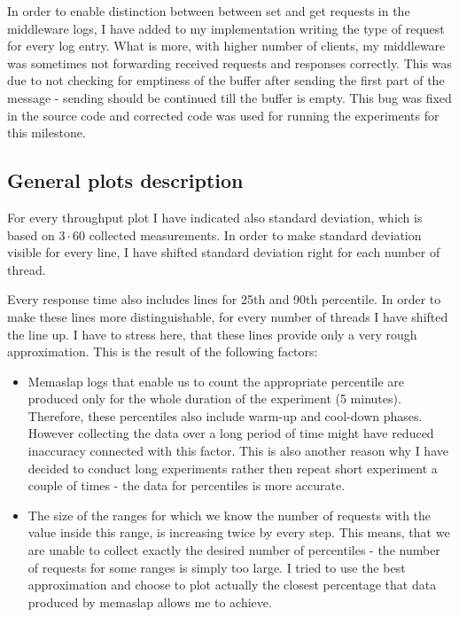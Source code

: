 \documentclass[11pt]{article}
\begin{document}
In order to enable distinction between between set and get requests in the middleware logs, I have added to my implementation writing the type of request for every log entry. What is more, with higher number of clients, my middleware was sometimes not forwarding received requests and responses correctly. This was due to not checking for emptiness of the buffer after sending the first part of the message - sending should be continued till the buffer is empty. This bug was fixed in the source code and corrected code was used for running the experiments for this milestone.

\subsection{General plots description}
\label{sec:max-throughput-plots}

For every throughput plot I have indicated also standard deviation, which is based on $3\cdot60$ collected measurements. In order to make standard deviation visible for every line, I have shifted standard deviation right for each number of thread.

Every response time also includes lines for 25th and 90th percentile. In order to make these lines more distinguishable, for every number of threads I have shifted the line up. I have to stress here, that these lines provide only a very rough approximation. This is the result of the following factors:
\begin{itemize}
\item Memaslap logs that enable us to count the appropriate percentile are produced only for the whole duration of the experiment (5 minutes). Therefore, these percentiles also include warm-up and cool-down phases. However collecting the data over a long period of time might have reduced inaccuracy connected with this factor. This is also another reason why I have decided to conduct long experiments rather then repeat short experiment a couple of times - the data for percentiles is more accurate.
\item The size of the ranges for which we know the number of requests with the value inside this range, is increasing twice by every step. This means, that we are unable to collect exactly the desired number of percentiles - the number of requests for some ranges is simply too large. I tried to use the best approximation and choose to plot actually the closest percentage that data produced by memaslap allows me to achieve.
\end{itemize}
\end{document}
